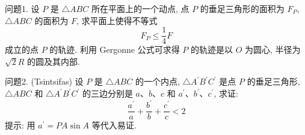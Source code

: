 
问题1. 设 $P$ 是 $\triangle A B C$ 所在平面上的一个动点, 点 $P$ 的垂足三角形的面积为 $F_P$, $\triangle A B C$ 的面积为 $F$, 求平面上使得不等式
$$
F_P \leqslant \frac{1}{4} F
$$
成立的点 $P$ 的轨迹.
利用 Gergonne 公式可求得 $P$ 的轨迹是以 $O$ 为圆心, 半径为 $\sqrt{2} R$ 的圆及其内部.



问题2. (Tsintsifas) 设 $P$ 是 $\triangle A B C$ 的一个内点, $\triangle A^{\prime} B^{\prime} C^{\prime}$ 是点 $P$ 的垂足三角形, $\triangle A B C$ 和 $\triangle A^{\prime} B^{\prime} C^{\prime}$ 的三边分别是 $a 、 b 、 c$ 和 $a^{\prime} 、 b^{\prime} 、 c^{\prime}$, 求证:
$$
\frac{a^{\prime}}{a}+\frac{b^{\prime}}{b}+\frac{c^{\prime}}{c}<2
$$
提示: 用 $a^{\prime}=P A \sin A$ 等代入易证.


